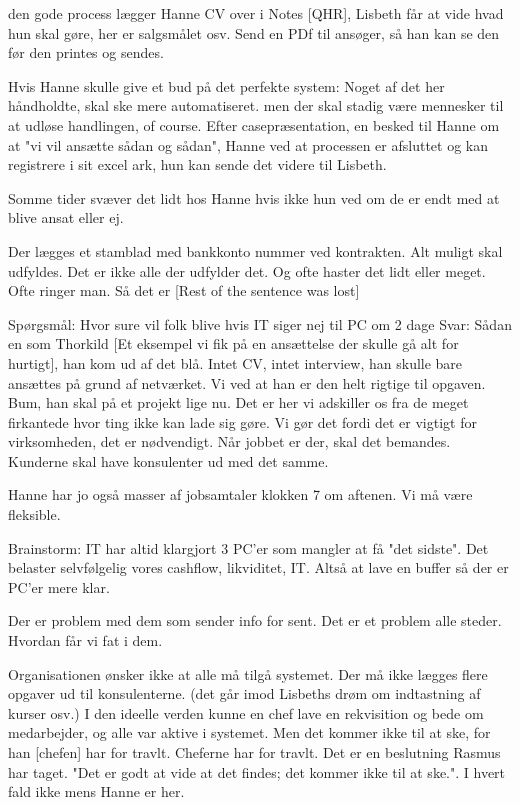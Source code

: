 \begin{linenumbers*}
[I] den gode process lægger Hanne CV over i Notes [QHR], Lisbeth får at vide hvad hun skal gøre, her er salgsmålet osv. Send en PDf til ansøger, så han kan se den før den printes og sendes.

Hvis Hanne skulle give et bud på det perfekte system:
Noget af det her håndholdte, skal ske mere automatiseret. men der skal stadig være mennesker til at udløse handlingen, of course. 
Efter casepræsentation, en besked til Hanne om at "vi vil ansætte sådan og sådan", Hanne ved at processen er afsluttet og kan registrere i sit excel ark, hun kan sende det videre til Lisbeth.

Somme tider svæver det lidt hos Hanne hvis ikke hun ved om de er endt med at blive ansat eller ej.

Der lægges et stamblad med bankkonto nummer ved kontrakten. Alt muligt skal udfyldes. Det er ikke alle der udfylder det. Og ofte haster det lidt eller meget. Ofte ringer man. Så det er [Rest of the sentence was lost]




Spørgsmål:
Hvor sure vil folk blive hvis IT siger nej til PC om 2 dage
Svar:
Sådan en som Thorkild [Et eksempel vi fik på en ansættelse der skulle gå alt for hurtigt], han kom ud af det blå. Intet CV, intet interview, han skulle bare ansættes på grund af netværket. Vi ved at han er den helt rigtige til opgaven. Bum, han skal på et projekt lige nu.
Det er her vi adskiller os fra de meget firkantede hvor ting ikke kan lade sig gøre. 
Vi gør det fordi det er vigtigt for virksomheden, det er nødvendigt. Når jobbet er der, skal det bemandes.
Kunderne skal have konsulenter ud med det samme.

Hanne har jo også masser af jobsamtaler klokken 7 om aftenen. Vi må være fleksible.

Brainstorm: IT har altid klargjort 3 PC'er som mangler at få "det sidste". Det belaster selvfølgelig vores cashflow, likviditet, IT.
Altså at lave en buffer så der er PC'er mere klar. 


Der er problem med dem som sender info for sent. Det er et problem alle steder. Hvordan får vi fat i dem.


Organisationen ønsker ikke at alle må tilgå systemet. Der må ikke lægges flere opgaver ud til konsulenterne. (det går imod Lisbeths drøm om indtastning af kurser osv.)
I den ideelle verden kunne en chef lave en rekvisition og bede om medarbejder, og alle var aktive i systemet. Men det kommer ikke til at ske, for han  [chefen] har for travlt.
Cheferne har for travlt. Det er en beslutning Rasmus har taget. "Det er godt at vide at det findes; det kommer ikke til at ske.". I hvert fald ikke mens Hanne er her.


\end{linenumbers*}
